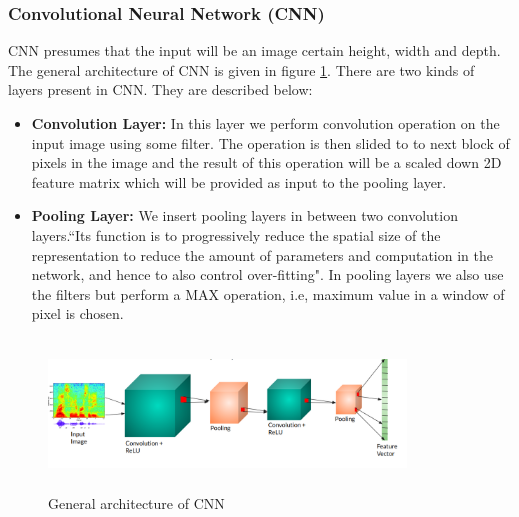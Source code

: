 \subsubsection{Convolutional Neural Network (CNN)}
CNN presumes that the input will be an image certain height, width and depth. The general architecture of CNN is given in figure \ref{fig2}. There are two kinds of layers present in CNN. They are described below: 
\begin{itemize}
    \item \textbf{Convolution Layer: }In this layer we perform convolution operation on the input image using some filter. The operation is then slided to to next block of pixels in the image and the result of this operation will be a scaled down 2D feature matrix which will be provided as input to the pooling layer. 
    \item \textbf{Pooling Layer: }We insert pooling layers in between two convolution layers.``Its function is to progressively reduce the spatial size of the representation to reduce the amount of parameters and computation in the network, and hence to also control over-fitting"\cite{b1}. In pooling layers we also use the filters but perform a MAX operation, i.e, maximum value in a window of pixel is chosen.
\end{itemize}
\begin{figure}[!htb]
\centerline{\includegraphics[height=40mm,width=95mm]{img/fig2.png}}
\caption{General architecture of CNN}
\label{fig2}
\end{figure}

